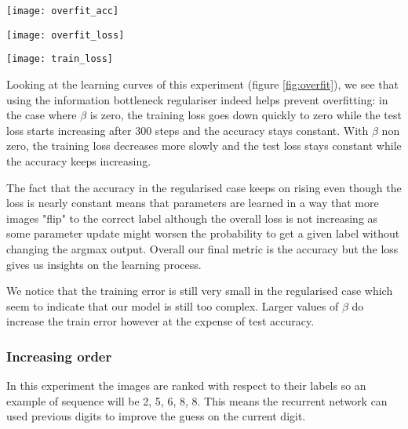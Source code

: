 \documentclass[11pt,oneside,openright]{report}
\begin{document}
\begin{center}
\vspace{1.0cm}
\begin{minipage}{0.5\textwidth}
        \centering
\texttt{[image: overfit\_acc]}
    \end{minipage}\hfill
    \begin{minipage}{0.5\textwidth}
        \centering
\texttt{[image: overfit\_loss]}
    \end{minipage}
\texttt{[image: train\_loss]}
\label{fig:overfit}
\vspace{1.0cm}
\end{center}

Looking at the learning curves of this experiment (figure \ref{fig:overfit}), we see that using the information bottleneck regulariser indeed helps prevent overfitting:  in the case where $\beta$ is zero, the training loss goes down quickly to zero while the test loss starts increasing after 300 steps and the accuracy stays constant. With $\beta$ non zero, the training loss decreases more slowly and the test loss stays constant while the accuracy keeps increasing.

The fact that the accuracy in the regularised case keeps on rising even though the loss is nearly constant means that parameters are learned in a way that more images "flip" to the correct label although the overall loss is not increasing as some parameter update might worsen the probability to get a given label without changing the argmax output. Overall our final metric is the accuracy but the loss gives us insights on the learning process.

We notice that the training error is still very small in the regularised case which seem to indicate that our model is still too complex. Larger values of $\beta$ do increase the train error however at the expense of test accuracy.

\subsubsection{Increasing order}
In this experiment the images are ranked with respect to their labels so an example of sequence will be 2, 5, 6, 8, 8. This means the recurrent network can used previous digits to improve the guess on the current digit.
\end{document}
